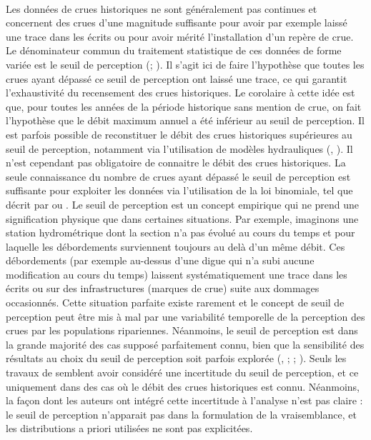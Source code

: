 	\paragraph{} Les données de crues historiques ne sont généralement pas continues et concernent des crues d'une magnitude suffisante pour avoir par exemple laissé une trace dans les écrits ou pour avoir mérité l'installation d'un repère de crue. Le dénominateur commun du traitement statistique de ces données de forme variée est le seuil de perception (\cite{gerard_probability_1979}; \cite{stedinger_flood_1986}). Il s'agit ici de faire l'hypothèse que toutes les crues ayant dépassé ce seuil de perception ont laissé une trace, ce qui garantit l'exhaustivité du recensement des crues historiques. Le corolaire à cette idée est que, pour toutes les années de la période historique sans mention de crue, on fait l'hypothèse que le débit maximum annuel a été inférieur au seuil de perception. Il est parfois possible de reconstituer le débit des crues historiques supérieures au seuil de perception, notamment via l'utilisation de modèles hydrauliques (\cite{neppel_flood_2010}, \cite{machado_flood_2015}). Il n'est cependant pas obligatoire de connaitre le débit des crues historiques. La seule connaissance du nombre de crues ayant dépassé le seuil de perception est suffisante pour exploiter les données via l'utilisation de la loi binomiale, tel que décrit par \citet{stedinger_flood_1986} ou \citet{payrastre_usefulness_2011}. Le seuil de perception est un concept empirique qui ne prend une signification physique que dans certaines situations. Par exemple, imaginons une station hydrométrique dont la section n'a pas évolué au cours du temps et pour laquelle les débordements surviennent toujours au delà d'un même débit. Ces débordements (par exemple au-dessus d'une digue qui n'a subi aucune modification au cours du temps) laissent systématiquement une trace dans les écrits ou sur des infrastructures (marques de crue) suite aux dommages occasionnés. Cette situation parfaite existe rarement et le concept de seuil de perception peut être mis à mal par une variabilité temporelle de la perception des crues par les populations ripariennes. Néanmoins, le seuil de perception est dans la grande majorité des cas supposé parfaitement connu, bien que la sensibilité des résultats au choix du seuil de perception soit parfois explorée (\cite{stedinger_flood_1986}, \cite{viglione_flood_2013}; \cite{macdonald_reassessing_2014}; \cite{payrastre_usefulness_2011}). Seuls les travaux de \citet{parkes_defining_2016} semblent avoir considéré une incertitude du seuil de perception, et ce uniquement dans des cas où le débit des crues historiques est connu. Néanmoins, la façon dont les auteurs ont intégré cette incertitude à l'analyse n'est pas claire : le seuil de perception n'apparait pas dans la formulation de la vraisemblance, et les distributions a priori utilisées ne sont pas explicitées. 

